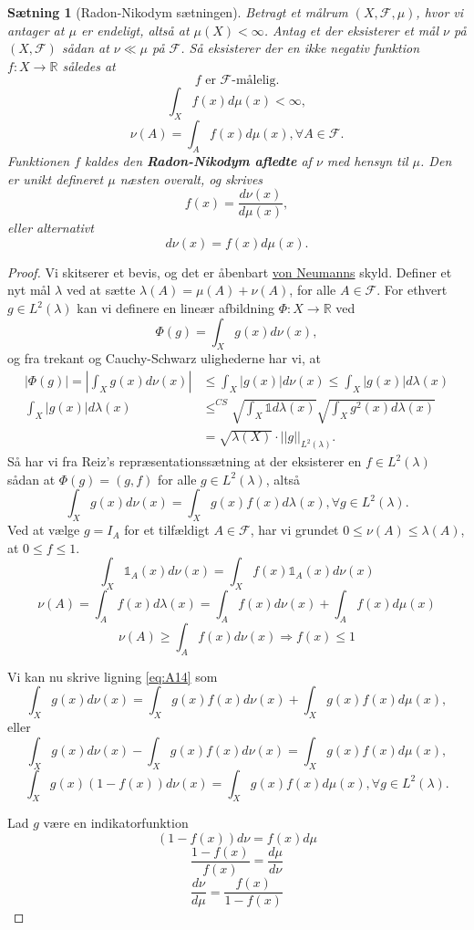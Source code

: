\documentclass[12pt]{report}
\newtheorem{theorem}[lemma]{Sætning}
\theoremstyle{break}
\newtheorem*{proof}{Bevis}
\theoremstyle{break}
\newcommand{\RR}{\mathbb{R}}
\newcommand{\FI}{\mathcal{F}}
\newcommand{\1}{\mathds{1}}
\begin{document}
\begin{theorem}[Radon-Nikodym sætningen]
	 Betragt et målrum $(X,\FI,\mu)$, hvor vi antager at $\mu$ er endeligt, altså at  $\mu(X)<\infty$. Antag et der eksisterer et mål $\nu$ på $(X,\FI)$ sådan at $\nu \ll \mu$ på $\FI$. Så eksisterer der en ikke negativ funktion $f\colon X\to \RR$ således at
	 \[ f \text{ er }\FI\text{-målelig.} \]
	 \[ \int_X f(x)d\mu(x)<\infty, \]
	 \[ \nu(A)=\int_A f(x)d\mu(x), \forall A\in \FI .\]
	 Funktionen $f$ kaldes den {\bf Radon-Nikodym afledte} af $\nu$ med hensyn til $\mu$. Den er unikt defineret $\mu$ næsten overalt, og skrives
	 \[ f(x)=\frac{d\nu(x)}{d\mu(x)}, \]
	 eller alternativt
	 \[ d\nu(x)=f(x)d\mu(x). \]
\end{theorem}
\begin{proof}
	Vi skitserer et bevis, og det er åbenbart \href{https://en.wikipedia.org/wiki/John_von_Neumann}{von Neumanns} skyld. Definer et nyt mål $\lambda$ ved at sætte $\lambda(A) = \mu(A)+\nu(A)$, for alle $A\in \FI$. For ethvert $g\in L^2(\lambda)$ kan vi definere en lineær afbildning $\Phi \colon X \to \RR$ ved
	\[ \Phi(g)=\int_Xg(x)d\nu(x), \]
	og fra trekant og Cauchy-Schwarz ulighederne har vi, at
	\begin{align*}
		|\Phi(g)|=\left\vert \int_X g(x)d\nu(x)\right\vert &\leq \int_X |g(x)|d\nu(x) \leq \int_X |g(x)|d\lambda(x)\\
		\int_X |g(x)|d\lambda(x)&\leq^{CS}\sqrt{\int_X\1 d\lambda(x)}\sqrt{\int_X g^2(x)d\lambda(x)}\\
		 &= \sqrt{\lambda(X)}\cdot ||g||_{L^2(\lambda)}. 
	\end{align*}
	Så har vi fra Reiz's repræsentationssætning at der eksisterer en $f\in L^2(\lambda)$ sådan at $\Phi(g)=(g,f)$ for alle $g\in L^2(\lambda)$, altså
	\begin{equation}
		\int_X g(x)d\nu(x)=\int_X g(x)f(x)d\lambda(x), \forall g\in L^2(\lambda).\label{eq:A14}
	\end{equation}
	Ved at vælge $g=I_A$ for et tilfældigt $A\in \FI$, har vi grundet $0\leq \nu(A)\leq\lambda(A)$, at $0\leq f \leq 1$. 
	\[ \int_X\1_A(x)d\nu(x)=\int_X f(x)\1_A(x)d\nu(x)\]
	\[ \nu(A)=\int_A f(x)d\lambda(x)=\int_A f(x)d\nu(x)+\int_A f(x)d\mu(x) \]
	\[ \nu(A)\geq \int_A f(x) d\nu(x) \Rightarrow f(x) \leq 1 \]
	
	Vi kan nu skrive ligning \ref{eq:A14} som
	\[ \int_Xg(x)d\nu(x)=\int_X g(x)f(x)d\nu(x)+\int_X g(x)f(x)d\mu(x), \]
	eller
	\[ \int_Xg(x)d\nu(x)-\int_X g(x)f(x)d\nu(x)=\int_X g(x)f(x)d\mu(x), \]
	\begin{equation}
		\int_X g(x)(1-f(x))d\nu(x)=\int_X g(x)f(x)d\mu(x), \forall g\in L^2(\lambda). \label{eq:A15}
	\end{equation}
	
	Lad $g$ være en indikatorfunktion
	\[ (1-f(x))d\nu=f(x)d\mu \]
	\[ \frac{1-f(x)}{f(x)}=\frac{d\mu}{d\nu} \]
	\[ \frac{d\nu}{d\mu}=\frac{f(x)}{1-f(x)}\]
\end{proof}
\end{document}
